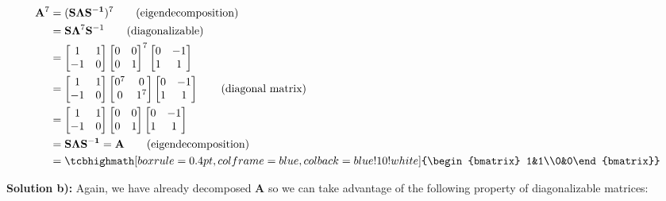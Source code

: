 \documentclass{article}
\begin{document}
\begin{align*}
    \mathbf{A}^7&=(\mathbf{S\Lambda S^{-1}})^7\tag{eigendecomposition}\\
    &=\mathbf{S}\mathbf{\Lambda}^7 \mathbf{S}^{-1}\tag{diagonalizable}\\
    &=\begin{bmatrix} 1&1\\-1&0\end{bmatrix}\begin{bmatrix} 0&0\\0&1\end{bmatrix}^7\begin{bmatrix} 0&-1\\1&1\end{bmatrix}\\
    &=\begin{bmatrix} 1&1\\-1&0\end{bmatrix}\begin{bmatrix} 0^7&0\\0&1^7\end{bmatrix}\begin{bmatrix} 0&-1\\1&1\end{bmatrix}\tag{diagonal matrix}\\
    &=\begin{bmatrix} 1&1\\-1&0\end{bmatrix}\begin{bmatrix} 0&0\\0&1\end{bmatrix}\begin{bmatrix} 0&-1\\1&1\end{bmatrix}\\
    &=\mathbf{S\Lambda S^{-1}}=\mathbf{A}\tag{eigendecomposition}\\
    &=\tcbhighmath[boxrule=0.4pt,colframe=blue,colback=blue!10!white]{\begin{bmatrix} 1&1\\0&0\end{bmatrix}}
\end{align*}
\medskip

\noindent\textbf{Solution b):} Again, we have already decomposed $\mathbf{A}$ so we can take advantage of the following property of diagonalizable matrices:
\end{document}

